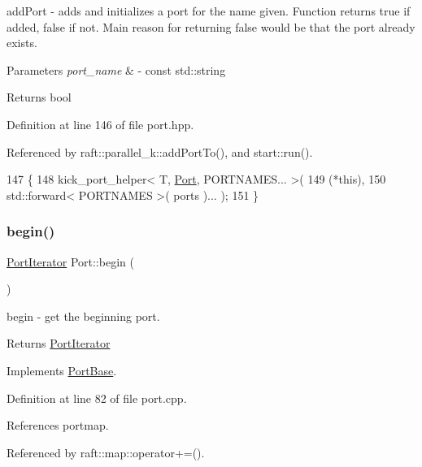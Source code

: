 add\+Port -\/ adds and initializes a port for the name given. Function returns true if added, false if not. Main reason for returning false would be that the port already exists. 
\begin{DoxyParams}{Parameters}
{\em port\+\_\+name} & -\/ const std\+::string \\
\hline
\end{DoxyParams}
\begin{DoxyReturn}{Returns}
bool 
\end{DoxyReturn}


Definition at line 146 of file port.\+hpp.



Referenced by raft\+::parallel\+\_\+k\+::add\+Port\+To(), and start\+::run().


\begin{DoxyCode}
147    \{
148        kick\_port\_helper< T, \hyperlink{class_port_afa3ede44d69282f75d45e714a590e152}{Port}, PORTNAMES... >(
149         (*this),
150         std::forward< PORTNAMES >( ports )... );
151    \}
\end{DoxyCode}
\hypertarget{class_port_abf4d86026b67f6c02db3e3abb0f2e8b4}{}\label{class_port_abf4d86026b67f6c02db3e3abb0f2e8b4} 
\subsubsection{\texorpdfstring{begin()}{begin()}}
{\footnotesize\ttfamily \hyperlink{class_port_iterator}{Port\+Iterator} Port\+::begin (\begin{DoxyParamCaption}{ }\end{DoxyParamCaption})\hspace{0.3cm}{\ttfamily [virtual]}}

begin -\/ get the beginning port. \begin{DoxyReturn}{Returns}
\hyperlink{class_port_iterator}{Port\+Iterator} 
\end{DoxyReturn}


Implements \hyperlink{class_port_base_afc54c92e3b9d1967e8a8c7e74d7507d3}{Port\+Base}.



Definition at line 82 of file port.\+cpp.



References portmap.



Referenced by raft\+::map\+::operator+=().


